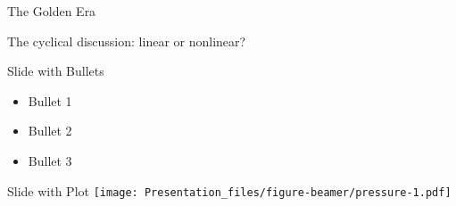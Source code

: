 \documentclass[
  ignorenonframetext,
]{beamer}
\providecommand{\tightlist}{%
  \setlength{\itemsep}{0pt}\setlength{\parskip}{0pt}}
\begin{document}
\begin{frame}{The Golden Era}
\protect\hypertarget{the-golden-era}{}
\end{frame}

\begin{frame}{The cyclical discussion: linear or nonlinear?}
\protect\hypertarget{the-cyclical-discussion-linear-or-nonlinear}{}
\end{frame}

\begin{frame}{Slide with Bullets}
\protect\hypertarget{slide-with-bullets}{}
\begin{itemize}
\tightlist
\item
  Bullet 1
\item
  Bullet 2
\item
  Bullet 3
\end{itemize}
\end{frame}

\begin{frame}{Slide with Plot}
\protect\hypertarget{slide-with-plot}{}
\texttt{[image: Presentation\_files/figure-beamer/pressure-1.pdf]}
\end{frame}
\end{document}
